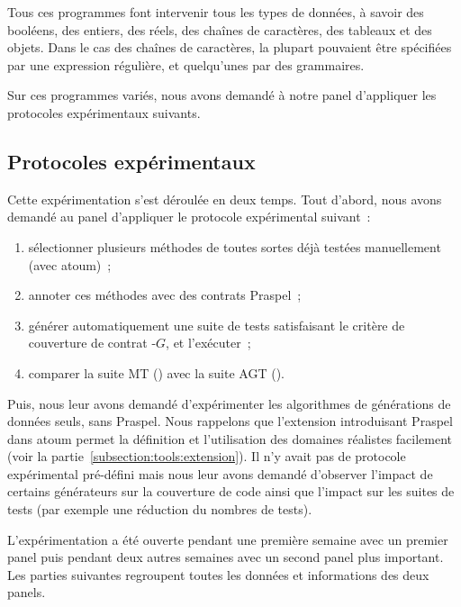 Tous ces programmes font intervenir tous les types de données, à savoir des
booléens, des entiers, des réels, des chaînes de caractères, des tableaux et des
objets. Dans le cas des chaînes de caractères, la plupart pouvaient être
spécifiées par une expression régulière, et quelqu'unes par des grammaires.

Sur ces programmes variés, nous avons demandé à notre panel d'appliquer les
protocoles expérimentaux suivants.

\subsection{Protocoles expérimentaux}
\label{subsection:experimentation:modus_operandi}

Cette expérimentation s'est déroulée en deux temps. Tout d'abord, nous avons
demandé au panel d'appliquer le protocole expérimental suivant~:
%
\begin{enumerate}

\item sélectionner plusieurs méthodes de toutes sortes déjà testées
manuellement (avec atoum)~;

\item annoter ces méthodes avec des contrats Praspel~;

\item générer automatiquement une suite de tests satisfaisant le critère de
couverture de contrat -$G$, et l'exécuter~;

\item comparer la suite MT () avec la suite AGT
().

\end{enumerate}

Puis, nous leur avons demandé d'expérimenter les algorithmes de générations de
données seuls, sans Praspel. Nous rappelons que l'extension introduisant Praspel
dans atoum permet la définition et l'utilisation des domaines réalistes
facilement (voir la partie~\ref{subsection:tools:extension}). Il n'y avait pas
de protocole expérimental pré-défini mais nous leur avons demandé d'observer
l'impact de certains générateurs sur la couverture de code ainsi que l'impact
sur les suites de tests (par exemple une réduction du nombres de tests).

L'expérimentation a été ouverte pendant une première semaine avec un premier
panel puis pendant deux autres semaines avec un second panel plus important. Les
parties suivantes regroupent toutes les données et informations des deux panels.

